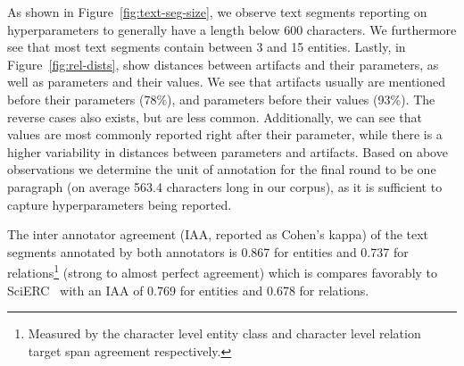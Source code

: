 

As shown in Figure~\ref{fig:text-seg-size}, we observe text segments reporting on hyperparameters to generally have a length below 600 characters. %
We furthermore see that most text segments contain between 3 and 15 entities. %
Lastly, in Figure~\ref{fig:rel-dists}, show distances between artifacts and their parameters, as well as parameters and their values. We see that artifacts usually are mentioned before their parameters (78\%), and parameters before their values (93\%). The reverse cases also exists, but are less common.
Additionally, we can see that values are most commonly reported right after their parameter, while there is a higher variability in distances between parameters and artifacts.
Based on above observations %
we determine the unit of annotation for the final round to be one paragraph (on average 563.4 characters long in our corpus), as it is sufficient to capture hyperparameters being reported.

The inter annotator agreement (IAA, reported as Cohen's kappa) of the text segments annotated by both annotators is 0.867 for entities and 0.737 for relations\footnote{Measured by the character level entity class and character level relation target span agreement respectively.} (strong to almost perfect agreement) which is compares favorably to SciERC~\cite{luan2018scierc} with an IAA of 0.769 for entities and 0.678 for relations.



